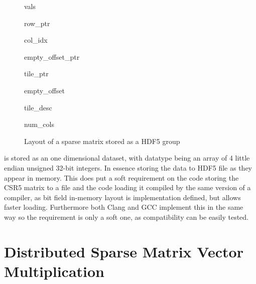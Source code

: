 \documentclass[thesis=M,english]{FITthesis}[2019/12/23]
\begin{document}
\begin{figure}[!h]
    \begin{tcolorbox}[title=/A, colback=gray!30!white]
        \begin{infobox}[colback=hdtsc]
            vals
        \end{infobox}
        \begin{infobox}[colback=hdtsc]
            row\_ptr
        \end{infobox}
        \begin{infobox}[colback=hdtsc]
            col\_idx
        \end{infobox}
        \begin{infobox}[colback=hdtsc, width=0.3\textwidth]
            empty\_offset\_ptr
        \end{infobox}
        \begin{infobox}[colback=hdtsc]
            tile\_ptr
        \end{infobox}
        \begin{infobox}[colback=hdtsc]
            empty\_offset
        \end{infobox}
        \begin{infobox}[colback=hdtsc]
            tile\_desc
        \end{infobox}
        \begin{infobox}[colback=hdatc, width=0.2\textwidth]
            num\_cols
        \end{infobox}
    \end{tcolorbox}
    \caption{Layout of a sparse matrix stored as a HDF5 group}
\end{figure}

 is stored as an one dimensional dataset, with datatype being
an array of 4 little endian unsigned 32-bit integers. In essence storing the data to HDF5 file as
they appear in memory. This does put a soft requirement on the code storing the CSR5 matrix to a file
and the code loading it compiled by the same version of a compiler, as
bit field in-memory layout is implementation defined, but allows faster loading. Furthermore both
Clang and GCC implement this in the same way so the requirement is only a soft one, as compatibility can
be easily tested.



\chapter{Distributed Sparse Matrix Vector Multiplication}
\end{document}
